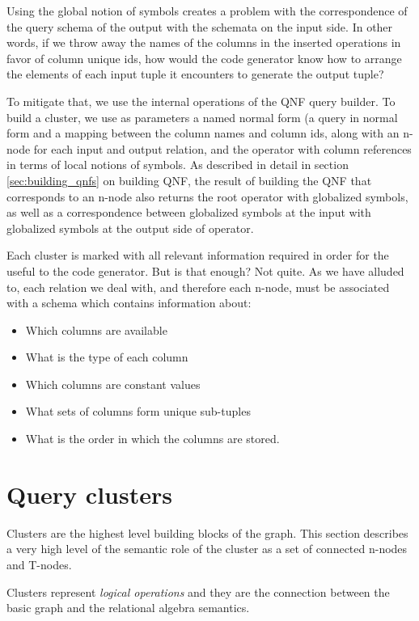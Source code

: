 Using the global notion of symbols creates a problem with the
correspondence of the query schema of the output with the schemata on
the input side. In other words, if we throw away the names of the
columns in the inserted operations in favor of column unique ids, how would the
code generator know how to arrange the elements of each input tuple
it encounters to generate the output tuple? 

To mitigate that, we use the internal operations of the QNF query builder. 
To build a cluster, we use as parameters a named normal form (a query in normal form and a
mapping between the column names and column ids, along with an n-node for each input
and output relation, and the operator with column references in terms
of local notions of symbols. As described in detail in section \ref{sec:building_qnfs} on building QNF,
the result of building the QNF that corresponds to an n-node also 
returns the root operator with globalized symbols, as well as a correspondence 
between globalized symbols at the input with globalized symbols at the
output side of operator.

Each cluster is marked with all  relevant information
required in order for the useful to the code generator. But is that
enough? Not quite. As we have alluded to, each relation we deal
with, and therefore each n-node, must be associated with a schema
which contains information about:

\begin{itemize}
\item Which columns are available
\item What is the type of each column
\item Which columns are constant values
\item What sets of columns form unique sub-tuples
\item What is the order in which the columns are stored.
\end{itemize}

\section{Query clusters}

Clusters are the highest level building blocks of the graph. This
section describes a very high level of the semantic role of the
cluster as a set of connected n-nodes and T-nodes.

Clusters represent \emph{logical operations} and they are the connection
between the basic graph and the relational algebra semantics.

